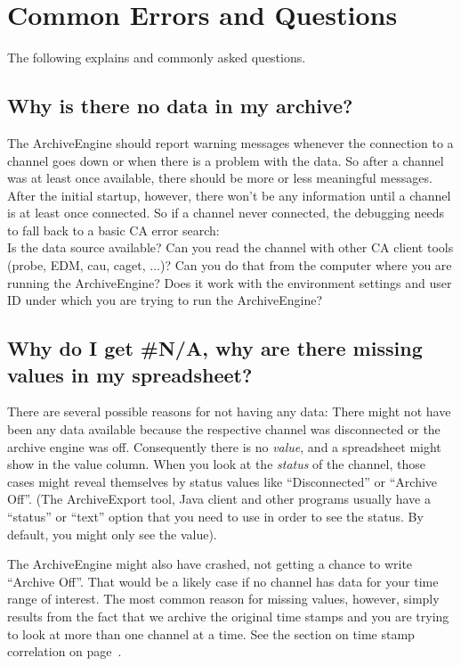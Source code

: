 \chapter{Common Errors and Questions}

The following explains  and commonly
asked questions.

\section{Why is there no data in my archive?}
The ArchiveEngine should report warning messages whenever the
connection to a channel goes down or when there is a problem with the
data. So after a channel was at least once available, there should be
more or less meaningful messages. After the initial startup, however,
there won't be any information until a channel is at least once
connected. So if a channel never connected, the debugging needs to
fall back to a basic CA error search:\\
Is the data source available?
Can you read the channel with other CA client tools
(probe, EDM, cau, caget, ...)?
Can you do that from the computer where you are running
the ArchiveEngine? Does it work with the environment settings and user
ID under which you are trying to run the ArchiveEngine?

\section{Why do I get \#N/A, why are there missing values in my spreadsheet?}
There are several possible reasons for not having any data: There
might not have been any data available because the respective channel
was disconnected or the archive engine was off.  Consequently there is
no \emph{value}, and a spreadsheet might show
 in the value column. When you look at the
\emph{status} of the channel, those cases might reveal themselves by status
values like ``Disconnected'' or ``Archive Off''.  (The ArchiveExport
tool, Java client and other programs usually have a ``status'' or
``text'' option that you need to use in order to see the status. By
default, you might only see the value).
 
The ArchiveEngine might also have crashed, not getting a chance to
write ``Archive Off''. That would be a likely case if no channel has
data for your time range of interest.  The most common reason for
missing values, however, simply results from the fact that we archive
the original time stamps and you are trying to look at more than one
channel at a time. See the section on time stamp correlation on page~\pageref{sec:timestampcorr}.  

